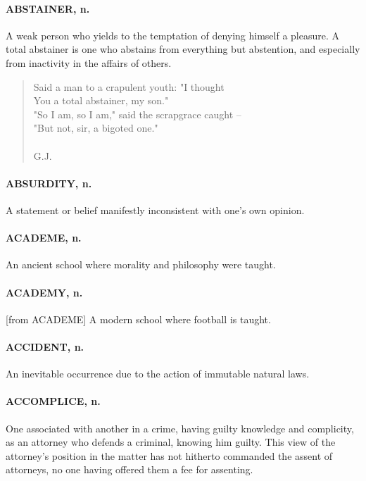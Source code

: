\documentclass[11pt]{article}
\begin{document}
\paragraph{ABSTAINER, n.}  A weak person who yields to the temptation of denying
himself a pleasure.  A total abstainer is one who abstains from
everything but abstention, and especially from inactivity in the
affairs of others.

\begin{quote}   Said a man to a crapulent youth:  "I thought \\
      You a total abstainer, my son." \\
  "So I am, so I am," said the scrapgrace caught -- \\
      "But not, sir, a bigoted one." \\
 \\
G.J. \end{quote}


\paragraph{ABSURDITY, n.}  A statement or belief manifestly inconsistent with
one's own opinion.

\paragraph{ACADEME, n.}  An ancient school where morality and philosophy were
taught.

\paragraph{ACADEMY, n.}  [from ACADEME]   A modern school where football is
taught.

\paragraph{ACCIDENT, n.}  An inevitable occurrence due to the action of immutable
natural laws.

\paragraph{ACCOMPLICE, n.}  One associated with another in a crime, having guilty
knowledge and complicity, as an attorney who defends a criminal,
knowing him guilty.  This view of the attorney's position in the
matter has not hitherto commanded the assent of attorneys, no one
having offered them a fee for assenting.
\end{document}
